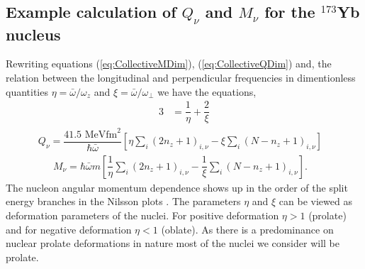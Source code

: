 \documentclass[8pt,a4paper, twoside]{report}
\begin{document}
\subsection{Example calculation of $Q_{\nu}$ and $M_{\nu}$ for the $^{173}$Yb nucleus}
Rewriting equations (\ref{eq:CollectiveMDim}), (\ref{eq:CollectiveQDim})  and, the relation between the longitudinal  and perpendicular frequencies in dimentionless quantities $\eta = \bar{\omega}/\omega_z$ and $\xi = \bar{\omega}/\omega_{\perp}$ we have the equations,
\begin{align}
3 &= \dfrac{1}{\eta} + \dfrac{2}{\xi} \label{eq:average} 
\end{align}
\begin{align}
Q_{\nu} = \dfrac{41.5\text{ MeV}\text{fm}^2}{\hbar\bar{\omega}}\left[\eta\sum_{i}\left(2n_z + 1\right)_{i,\nu}  - \xi\sum_{i}\left(N - n_z + 1\right)_{i,\nu}\right]&
\label{eq:QDimensionless}
\end{align}
\begin{align}
M_{\nu} = \hbar\bar{\omega}m\left[\dfrac{1}{\eta}\sum_{i}\left(2n_z + 1\right)_{i,\nu} - \dfrac{1}{\xi}\sum_{i}\left(N - n_z + 1\right)_{i,\nu}\right]. & \label{eq:MDimensionless}
\end{align}
The nucleon angular momentum dependence shows up in the order of the split energy branches in the Nilsson plots \cite{Nilsson1955, BohrMottVol2}.
The parameters $\eta$ and $\xi$ can be viewed as deformation parameters of the nuclei. For positive deformation $\eta > 1$ (prolate) and for negative deformation $\eta < 1$ (oblate). As there is a predominance on nuclear prolate deformations in nature most of the nuclei we consider will be prolate. \\
\end{document}
